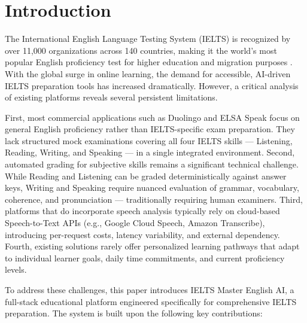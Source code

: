 \documentclass[conference]{IEEEtran}
\begin{document}
\section{Introduction}

The International English Language Testing System (IELTS) is recognized by over 11,000 organizations across 140 countries, making it the world's most popular English proficiency test for higher education and migration purposes \cite{ielts_stats}. With the global surge in online learning, the demand for accessible, AI-driven IELTS preparation tools has increased dramatically. However, a critical analysis of existing platforms reveals several persistent limitations.

First, most commercial applications such as Duolingo and ELSA Speak focus on general English proficiency rather than IELTS-specific exam preparation. They lack structured mock examinations covering all four IELTS skills --- Listening, Reading, Writing, and Speaking --- in a single integrated environment. Second, automated grading for subjective skills remains a significant technical challenge. While Reading and Listening can be graded deterministically against answer keys, Writing and Speaking require nuanced evaluation of grammar, vocabulary, coherence, and pronunciation --- traditionally requiring human examiners. Third, platforms that do incorporate speech analysis typically rely on cloud-based Speech-to-Text APIs (e.g., Google Cloud Speech, Amazon Transcribe), introducing per-request costs, latency variability, and external dependency. Fourth, existing solutions rarely offer personalized learning pathways that adapt to individual learner goals, daily time commitments, and current proficiency levels.

To address these challenges, this paper introduces IELTS Master English AI, a full-stack educational platform engineered specifically for comprehensive IELTS preparation. The system is built upon the following key contributions:
\end{document}
